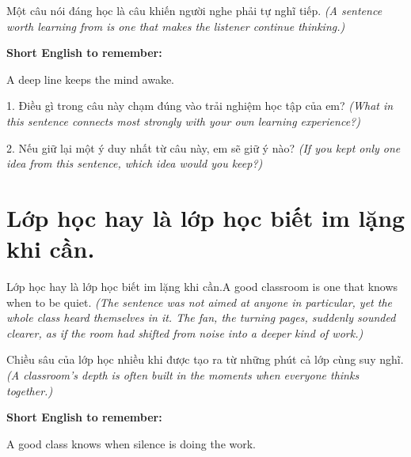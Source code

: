 \begin{baihoc}
Một câu nói đáng học là câu khiến người nghe phải tự nghĩ tiếp.
\textit{(A sentence worth learning from is one that makes the listener continue thinking.)}
\end{baihoc}

\begin{ghinhoanh}
\textbf{Short English to remember:}

A deep line keeps the mind awake.

\end{ghinhoanh}

\begin{tuhocnhanh}
1. Điều gì trong câu này chạm đúng vào trải nghiệm học tập của em? \textit{(What in this sentence connects most strongly with your own learning experience?)}

2. Nếu giữ lại một ý duy nhất từ câu này, em sẽ giữ ý nào? \textit{(If you kept only one idea from this sentence, which idea would you keep?)}
\end{tuhocnhanh}
\ngancach


\section{Lớp học hay là lớp học biết im lặng khi cần.}
\begin{truyen}{Lớp học hay là lớp học biết im lặng khi cần.}{A good classroom is one that knows when to be quiet.}
\textit{(The sentence was not aimed at anyone in particular, yet the whole class heard themselves in it. The fan, the turning pages, suddenly sounded clearer, as if the room had shifted from noise into a deeper kind of work.)}
\end{truyen}

\begin{baihoc}
Chiều sâu của lớp học nhiều khi được tạo ra từ những phút cả lớp cùng suy nghĩ.
\textit{(A classroom's depth is often built in the moments when everyone thinks together.)}
\end{baihoc}

\begin{ghinhoanh}
\textbf{Short English to remember:}

A good class knows when silence is doing the work.

\end{ghinhoanh}

